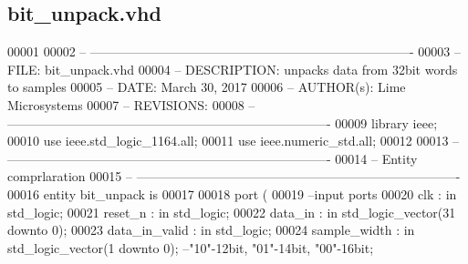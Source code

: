 \subsection{bit\+\_\+unpack.\+vhd}
\label{bit__unpack_8vhd_source}

\begin{DoxyCode}
00001 
00002 \textcolor{keyword}{-- ---------------------------------------------------------------------------- }
00003 \textcolor{keyword}{-- FILE:    bit\_unpack.vhd}
00004 \textcolor{keyword}{-- DESCRIPTION: unpacks data from 32bit words to samples}
00005 \textcolor{keyword}{-- DATE:    March 30, 2017}
00006 \textcolor{keyword}{-- AUTHOR(s):   Lime Microsystems}
00007 \textcolor{keyword}{-- REVISIONS:}
00008 \textcolor{keyword}{-- ---------------------------------------------------------------------------- }
00009 \textcolor{vhdlkeyword}{library }\textcolor{keywordflow}{ieee};
00010 \textcolor{vhdlkeyword}{use }ieee.std\_logic\_1164.\textcolor{keywordflow}{all};
00011 \textcolor{vhdlkeyword}{use }ieee.numeric\_std.\textcolor{keywordflow}{all};
00012 
00013 \textcolor{keyword}{-- ----------------------------------------------------------------------------}
00014 \textcolor{keyword}{-- Entity comprlaration}
00015 \textcolor{keyword}{-- ----------------------------------------------------------------------------}
00016 \textcolor{keywordflow}{entity }bit_unpack \textcolor{keywordflow}{is}
00017 
00018   \textcolor{keywordflow}{port} \textcolor{vhdlchar}{(}
00019 \textcolor{keyword}{        --input ports }
00020         \textcolor{vhdlchar}{clk}             \textcolor{vhdlchar}{:} \textcolor{keywordflow}{in} \textcolor{comment}{std\_logic};
00021         \textcolor{vhdlchar}{reset_n}         \textcolor{vhdlchar}{:} \textcolor{keywordflow}{in} \textcolor{comment}{std\_logic};
00022         \textcolor{vhdlchar}{data_in}         \textcolor{vhdlchar}{:} \textcolor{keywordflow}{in} \textcolor{comment}{std\_logic\_vector}\textcolor{vhdlchar}{(}\textcolor{vhdllogic}{}\textcolor{vhdllogic}{31} \textcolor{keywordflow}{downto} \textcolor{vhdllogic}{}\textcolor{vhdllogic}{0}\textcolor{vhdlchar}{)};
00023         \textcolor{vhdlchar}{data_in_valid}   \textcolor{vhdlchar}{:} \textcolor{keywordflow}{in} \textcolor{comment}{std\_logic};
00024         \textcolor{vhdlchar}{sample_width}    \textcolor{vhdlchar}{:} \textcolor{keywordflow}{in} \textcolor{comment}{std\_logic\_vector}\textcolor{vhdlchar}{(}\textcolor{vhdllogic}{}\textcolor{vhdllogic}{1} \textcolor{keywordflow}{downto} \textcolor{vhdllogic}{}\textcolor{vhdllogic}{0}\textcolor{vhdlchar}{)};\textcolor{keyword}{ --"10"-12bit, "01"-14bit, "00"-16bit;}

\end{DoxyCode}
